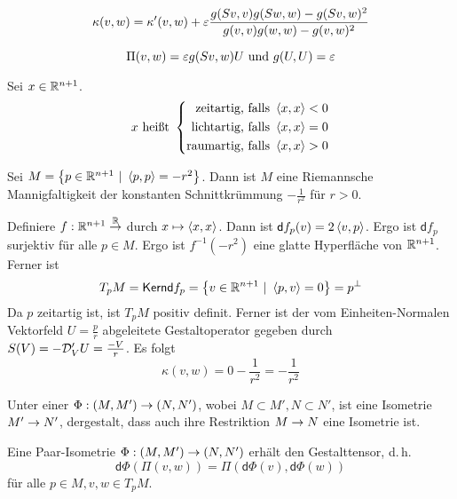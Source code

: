 \documentclass{article}
\renewcommand{\i}{^{-1}}
\renewcommand{\d}{\textsf{d}}
\begin{document}
\Kor{}
\[ \kappa(v,w) = \kappa'(v,w) + \varepsilon \frac{g(Sv,v)g(Sw,w) - g(Sv,w)^2}{g(v,v) g(w,w) - g(v,w)^2} \]
\begin{Beweis}{}
\[ \Pi(v,w) = \varepsilon g(Sv,w) U \text{ und } g(U,U) = \varepsilon \]
\end{Beweis}

Sei $x \in \mathbb{R}^{n+1}$.
\begin{align*}
x \text{ heißt } \left\lbrace \begin{aligned}
\text{zeitartig, falls } &\left<x,x\right> < 0\\
\text{lichtartig, falls } &\left<x,x\right> = 0\\
\text{raumartig, falls } &\left<x,x\right> > 0
\end{aligned} \right.
\end{align*}

\Prop{}
Sei $M = \set{p \in \R^{n+1}}{\shrp{p,p} = -r^2}$. Dann ist $M$ eine Riemannsche Mannigfaltigkeit der konstanten Schnittkrümmung $-\frac{1}{r^2}$ für $r > 0$.
\begin{Beweis}{}
Definiere $f : \mathbb{R}^{n+1} \overset{\mathbb{R}}{\rightarrow}$ durch $x \mapsto \left<x,x\right>$. Dann ist $\d f_p(v) = 2\shrp{v,p}$. Ergo ist $\d f_p$ surjektiv für alle $p \in M$. Ergo ist $f\i(-r^2)$ eine glatte Hyperfläche von $\mathbb{R}^{n+1}$.\\
Ferner ist
\[ T_pM = \Ker \d f_p  = \set{v \in \R^{n+1}}{\shrp{p,v} = 0} = p^\bot \]
Da $p$ zeitartig ist, ist $T_pM$ positiv definit. Ferner ist der vom Einheiten-Normalen Vektorfeld $U = \frac{p}{r}$ abgeleitete Gestaltoperator gegeben durch $S(V) = - \mathcal{D}'_VU = \frac{-V}{r}$. Es folgt
\[ \kappa(v,w) = 0 - \frac{1}{r^2} = - \frac{1}{r^2} \] 
\end{Beweis}

\Def{}
Unter einer  $\Phi : (M,M') \overset{}{\rightarrow} (N,N')$, wobei $M \subset M', N \subset N'$, ist eine Isometrie $M' \overset{}{\rightarrow} N'$, dergestalt, dass auch ihre Restriktion $M \overset{}{\rightarrow} N$ eine Isometrie ist.

\Lem{}
Eine Paar-Isometrie $\Phi : (M,M') \overset{}{\rightarrow} (N,N')$ erhält den Gestalttensor, d.\,h.
\[ \d \Phi (\Pi (v,w)) = \Pi ( \d \Phi(v),\d \Phi(w) ) \]
für alle $p \in M, v,w \in T_pM$.
\end{document}
